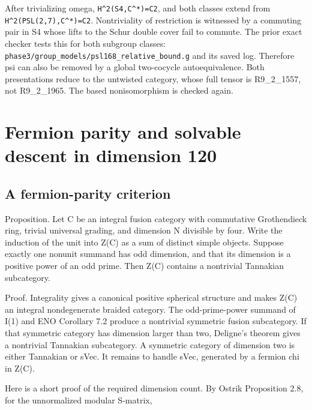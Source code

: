 After trivializing omega,
\texttt{H\textasciicircum{}2(S4\allowbreak{},C\textasciicircum{}*)=\allowbreak{}C2},
and both classes extend from
\texttt{H\textasciicircum{}2(PS\allowbreak{}L(2,7)\allowbreak{},C\textasciicircum{}*)=\allowbreak{}C2}.
Nontriviality of restriction is witnessed by a commuting pair in S4
whose lifts to the Schur double cover fail to commute. The prior exact
checker tests this for both subgroup classes:
\texttt{phase3\allowbreak{}/\allowbreak{}group\_\allowbreak{}models\allowbreak{}/\allowbreak{}psl168\allowbreak{}\_\allowbreak{}relati\allowbreak{}ve\_\allowbreak{}bound.\allowbreak{}g}
and its saved log. Therefore psi can also be removed by a global
two-cocycle autoequivalence. Both presentations reduce to the untwisted
category, whose full tensor is R9\_2\_1557, not R9\_2\_1965. The based
nonisomorphism is checked again.

\hypertarget{fermion-parity-and-solvable-descent-in-dimension-120}{%
\section{Fermion parity and solvable descent in dimension
120}\label{fermion-parity-and-solvable-descent-in-dimension-120}}

\hypertarget{a-fermion-parity-criterion}{%
\subsection{A fermion-parity
criterion}\label{a-fermion-parity-criterion}}

Proposition. Let C be an integral fusion category with commutative
Grothendieck ring, trivial universal grading, and dimension N divisible
by four. Write the induction of the unit into Z(C) as a sum of distinct
simple objects. Suppose exactly one nonunit summand has odd dimension,
and that its dimension is a positive power of an odd prime. Then Z(C)
contains a nontrivial Tannakian subcategory.

Proof. Integrality gives a canonical positive spherical structure and
makes Z(C) an integral nondegenerate braided category. The
odd-prime-power summand of I(1) and ENO Corollary 7.2 produce a
nontrivial symmetric fusion subcategory. If that symmetric category has
dimension larger than two, Deligne's theorem gives a nontrivial
Tannakian subcategory. A symmetric category of dimension two is either
Tannakian or sVec. It remains to handle sVec, generated by a fermion chi
in Z(C).

Here is a short proof of the required dimension count. By Ostrik
Proposition 2.8, for the unnormalized modular S-matrix,

